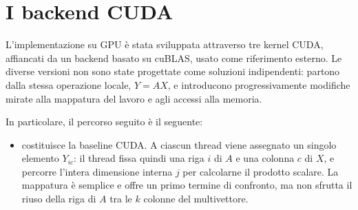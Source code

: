 \chapter{I backend CUDA}\label{cap:cuda}

L'implementazione su GPU è stata sviluppata attraverso tre kernel CUDA,
affiancati da un backend basato su cuBLAS, usato come riferimento esterno.
Le diverse versioni non sono state progettate come soluzioni indipendenti:
partono dalla stessa operazione locale, $Y = AX$, e introducono
progressivamente modifiche mirate alla mappatura del lavoro e agli accessi
alla memoria.

In particolare, il percorso seguito è il seguente:

\begin{itemize}
    \item \textbf{} costituisce la baseline CUDA.
    A ciascun thread viene assegnato un singolo elemento $Y_{ic}$:
    il thread fissa quindi una riga $i$ di $A$ e una colonna $c$ di $X$,
    e percorre l'intera dimensione interna $j$ per calcolarne il prodotto
    scalare. La mappatura è semplice e offre un primo termine di confronto,
    ma non sfrutta il riuso della riga di $A$ tra le $k$ colonne del
    multivettore.
\end{itemize}



